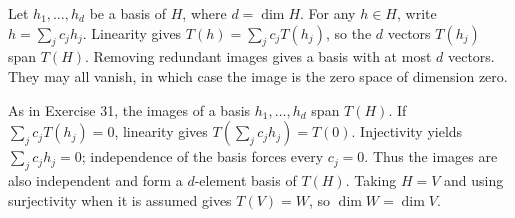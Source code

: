 Let $h_1,\ldots,h_d$ be a basis of $H$, where $d=\dim H$.
For any $h\in H$, write $h=\sum_jc_jh_j$. Linearity gives
$T(h)=\sum_jc_jT(h_j)$, so the $d$ vectors $T(h_j)$ span $T(H)$.
Removing redundant images gives a basis with at most $d$ vectors.
They may all vanish, in which case the image is the zero space of
dimension zero.

As in Exercise 31, the images of a basis $h_1,\ldots,h_d$ span
$T(H)$. If $\sum_jc_jT(h_j)=0$, linearity gives
$T(\sum_jc_jh_j)=T(0)$. Injectivity yields $\sum_jc_jh_j=0$;
independence of the basis forces every $c_j=0$. Thus the images are
also independent and form a $d$-element basis of $T(H)$.
Taking $H=V$ and using surjectivity when it is assumed gives $T(V)=W$,
so $\dim W=\dim V$.

